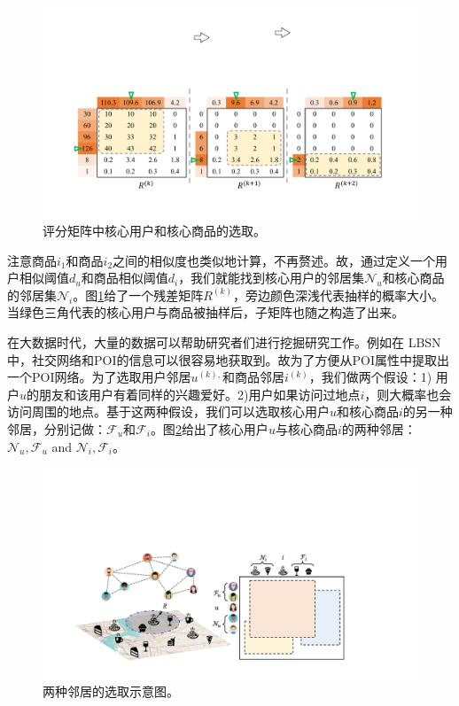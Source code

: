 \begin{figure}[t!]
\includegraphics[width=\textwidth]{pics/MF.pdf}
\caption{评分矩阵中核心用户和核心商品的选取。} \label{MF}
\end{figure}
\noindent 注意商品$i_1$和商品$i_2$之间的相似度也类似地计算，不再赘述。故，通过定义一个用户相似阈值$d_u$和商品相似阈值$d_i$，我们就能找到核心用户的邻居集$\mathcal{N}_u$和核心商品的邻居集$\mathcal{N}_i$。图\ref{MF}给了一个残差矩阵$R^{(k)}$，旁边颜色深浅代表抽样的概率大小。当绿色三角代表的核心用户与商品被抽样后，子矩阵也随之构造了出来。

在大数据时代，大量的数据可以帮助研究者们进行挖掘研究工作。例如在 LBSN中，社交网络和POI的信息可以很容易地获取到。故为了方便从POI属性中提取出一个POI网络。为了选取用户邻居$u^{(k),}$和商品邻居$i^{(k)}$，我们做两个假设：1) 用户$u$的朋友和该用户有着同样的兴趣爱好。2)用户如果访问过地点$i$，则大概率也会访问周围的地点。基于这两种假设，我们可以选取核心用户$u$和核心商品$i$的另一种邻居，分别记做：$\mathcal{F}_u$和$\mathcal{F}_i$。图\ref{BLOMA}给出了核心用户$u$与核心商品$i$的两种邻居：$\mathcal{N}_u, \mathcal{F}_u$ and $\mathcal{N}_i, \mathcal{F}_i$。



\begin{figure}[t!]
\includegraphics[width=\textwidth]{pics/BLOMA.pdf}
\caption{两种邻居的选取示意图。} 
\label{BLOMA}
\end{figure}
